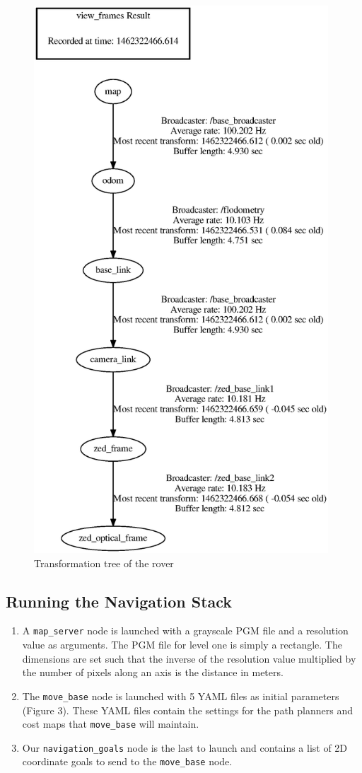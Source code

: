 \documentclass[10pt, oneside,onecolumn]{IEEEtran}
\begin{document}
\begin{figure}[p!]
\centering
\includegraphics[width=110mm]{frames.eps}
\caption{Transformation tree of the rover}
\end{figure}

\subsection{Running the Navigation Stack}
\begin{enumerate}

\item A \texttt{map\_server} node is launched with a grayscale PGM file and a resolution value as arguments. The PGM file for level one is simply a rectangle. The dimensions are set such that the inverse of the resolution value multiplied by the number of pixels along an axis is the distance in meters. 

\item The \texttt{move\_base} node is launched with 5 YAML files as initial parameters (Figure 3). These YAML files contain the settings for the path planners and cost maps that \texttt{move\_base} will maintain. 

\item Our \texttt{navigation\_goals} node is the last to launch and contains a list of 2D coordinate goals to send to the \texttt{move\_base} node. 
\end{enumerate}
\end{document}

